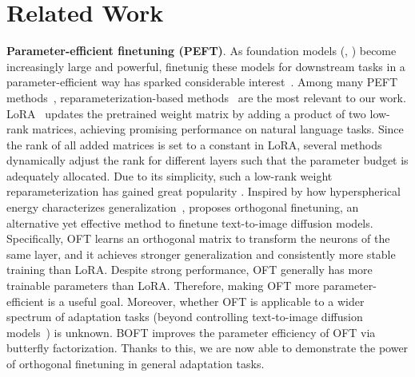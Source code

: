 \vspace{-2.25mm}
\section{Related Work}
\vspace{-2.25mm}

\textbf{Parameter-efficient finetuning (PEFT)}. As foundation models (\eg, \cite{brown2020language,radford2021learning,rombach2022high,kirillov2023segment})  become increasingly large and powerful, finetunig these models for downstream tasks in a parameter-efficient way has sparked considerable interest~\cite{treviso2023efficient,ding2023parameter,lialin2023scaling}. Among many PEFT methods~\cite{houlsby2019parameter,aghajanyan2020intrinsic,hulora2022,edalati2022krona,wang2022adamix,gheini2021cross,zaken2022bitfit,guo2020parameter,sung2021training,ansell2022composable,lester2021power,li2021prefix,vu2022spot,he2021towards,mao2021unipelt,karimi2021compacter,liu2022few,sung2022lst,chen2022parameter,jia2022visual,chen2022adaptformer,zhang2022neural,jie2023fact,lian2022scaling,luo2023towards}, reparameterization-based methods~\cite{aghajanyan2020intrinsic,hulora2022,edalati2022krona} are the most relevant to our work. LoRA~\cite{hulora2022} updates the pretrained weight matrix by adding a product of two low-rank matrices, achieving promising performance on natural language tasks. Since the rank of all added matrices is set to a constant in LoRA, several methods \cite{zhang2022adaptive,valipour2022dylora,zhang2023increlora} dynamically adjust the rank for different layers such that the parameter budget is adequately allocated. Due to its simplicity, such a low-rank weight reparameterization has gained great popularity 
 \cite{dettmers2023qlora,zi2023delta,chavan2023one}. Inspired by how hyperspherical energy characterizes generalization~\cite{liu2018learning,liu2021orthogonal}, \cite{qiu2023controlling} proposes orthogonal finetuning, an alternative yet effective method to finetune text-to-image diffusion models. Specifically, OFT learns an orthogonal matrix to transform the neurons of the same layer, and it achieves stronger generalization and consistently more stable training than LoRA. Despite strong performance, OFT generally has more trainable parameters than LoRA. Therefore, making OFT more parameter-efficient is a useful goal. Moreover, whether OFT is applicable to a wider spectrum of adaptation tasks (beyond controlling text-to-image diffusion models~\cite{qiu2023controlling}) is unknown. BOFT improves the parameter efficiency of OFT via butterfly factorization. Thanks to this, we are now able to demonstrate the power of orthogonal finetuning in general adaptation tasks.

